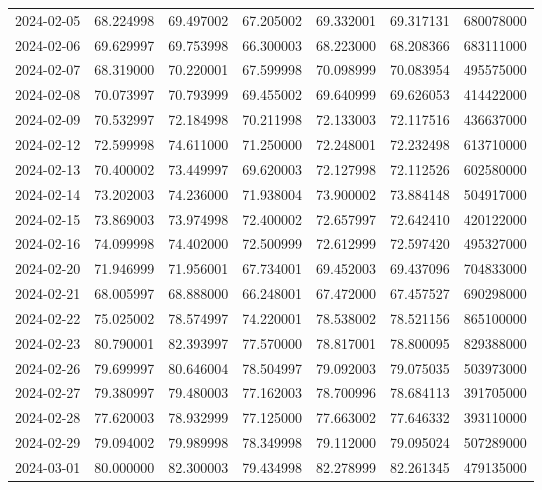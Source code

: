 \begin{tabular}{lrrrrrr}
2024-02-05 &   68.224998 &   69.497002 &   67.205002 &   69.332001 &   69.317131 &   680078000 \\
2024-02-06 &   69.629997 &   69.753998 &   66.300003 &   68.223000 &   68.208366 &   683111000 \\
2024-02-07 &   68.319000 &   70.220001 &   67.599998 &   70.098999 &   70.083954 &   495575000 \\
2024-02-08 &   70.073997 &   70.793999 &   69.455002 &   69.640999 &   69.626053 &   414422000 \\
2024-02-09 &   70.532997 &   72.184998 &   70.211998 &   72.133003 &   72.117516 &   436637000 \\
2024-02-12 &   72.599998 &   74.611000 &   71.250000 &   72.248001 &   72.232498 &   613710000 \\
2024-02-13 &   70.400002 &   73.449997 &   69.620003 &   72.127998 &   72.112526 &   602580000 \\
2024-02-14 &   73.202003 &   74.236000 &   71.938004 &   73.900002 &   73.884148 &   504917000 \\
2024-02-15 &   73.869003 &   73.974998 &   72.400002 &   72.657997 &   72.642410 &   420122000 \\
2024-02-16 &   74.099998 &   74.402000 &   72.500999 &   72.612999 &   72.597420 &   495327000 \\
2024-02-20 &   71.946999 &   71.956001 &   67.734001 &   69.452003 &   69.437096 &   704833000 \\
2024-02-21 &   68.005997 &   68.888000 &   66.248001 &   67.472000 &   67.457527 &   690298000 \\
2024-02-22 &   75.025002 &   78.574997 &   74.220001 &   78.538002 &   78.521156 &   865100000 \\
2024-02-23 &   80.790001 &   82.393997 &   77.570000 &   78.817001 &   78.800095 &   829388000 \\
2024-02-26 &   79.699997 &   80.646004 &   78.504997 &   79.092003 &   79.075035 &   503973000 \\
2024-02-27 &   79.380997 &   79.480003 &   77.162003 &   78.700996 &   78.684113 &   391705000 \\
2024-02-28 &   77.620003 &   78.932999 &   77.125000 &   77.663002 &   77.646332 &   393110000 \\
2024-02-29 &   79.094002 &   79.989998 &   78.349998 &   79.112000 &   79.095024 &   507289000 \\
2024-03-01 &   80.000000 &   82.300003 &   79.434998 &   82.278999 &   82.261345 &   479135000 \\

\end{tabular}
